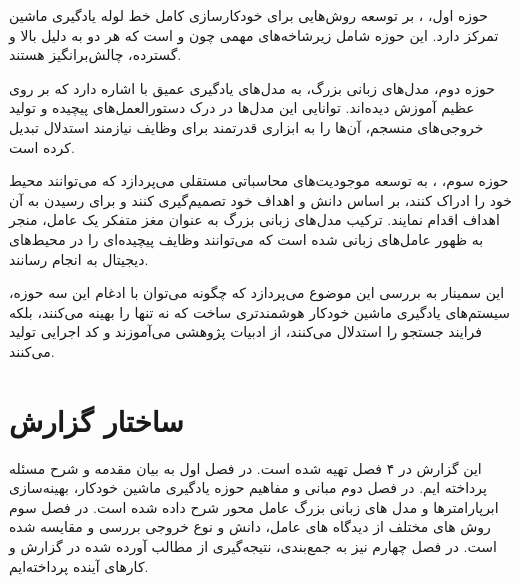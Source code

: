 حوزه اول، ، بر توسعه روش‌هایی برای خودکارسازی کامل خط لوله یادگیری ماشین تمرکز دارد. این حوزه شامل زیرشاخه‌های مهمی چون  و  است که هر دو به دلیل  بالا و  گسترده، چالش‌برانگیز هستند.

حوزه دوم، مدل‌های زبانی بزرگ، به مدل‌های یادگیری عمیق با  اشاره دارد که بر روی  عظیم آموزش دیده‌اند. توانایی این مدل‌ها در درک دستورالعمل‌های پیچیده و تولید خروجی‌های منسجم، آن‌ها را به ابزاری قدرتمند برای وظایف نیازمند استدلال تبدیل کرده است.

حوزه سوم، ، به توسعه موجودیت‌های محاسباتی مستقلی می‌پردازد که می‌توانند محیط خود را ادراک کنند، بر اساس دانش و اهداف خود تصمیم‌گیری کنند و برای رسیدن به آن اهداف اقدام نمایند. ترکیب مدل‌های زبانی بزرگ به عنوان مغز متفکر یک عامل، منجر به ظهور عامل‌های زبانی شده است که می‌توانند وظایف پیچیده‌ای را در محیط‌های دیجیتال به انجام رسانند.

این سمینار به بررسی این موضوع می‌پردازد که چگونه می‌توان با ادغام این سه حوزه، سیستم‌های یادگیری ماشین خودکار هوشمندتری ساخت که نه تنها  را بهینه می‌کنند، بلکه فرایند جستجو را استدلال می‌کنند، از ادبیات پژوهشی می‌آموزند و کد اجرایی تولید می‌کنند.

\section{ساختار گزارش}
این گزارش در ۴ فصل تهیه شده است. در فصل اول به بیان مقدمه و شرح مسئله پرداخته ایم. در فصل دوم مبانی و مفاهیم حوزه یادگیری ماشین خودکار، بهینه‌سازی ابرپارامترها و مدل های زبانی بزرگ عامل محور شرح داده شده است. در فصل سوم روش های مختلف از دیدگاه های عامل، دانش و نوع خروجی بررسی و مقایسه شده است. در فصل چهارم نیز به جمع‌بندی، نتیجه‌گیری از مطالب آورده شده در گزارش و کارهای آینده پرداخته‌ایم.
